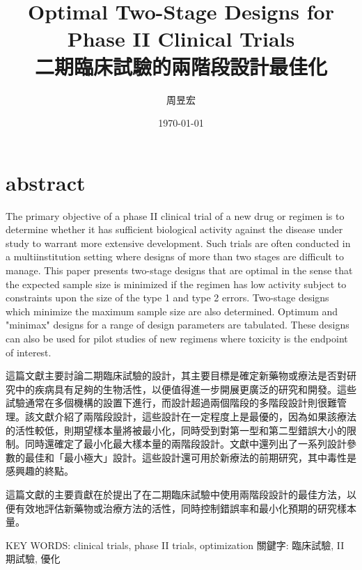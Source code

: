 
\title{Optimal Two-Stage Designs for Phase II Clinical Trials\\二期臨床試驗的兩階段設計最佳化}
\author{{周昱宏}}
\date{{\TT \today}}

\maketitle
\fontsize{12}{22 pt}\selectfont
\doublespacing

\section{abstract}
	The primary objective of a phase II clinical trial of a new drug or regimen is to determine whether it has sufficient biological activity against the disease under study to warrant more extensive development. Such trials are often conducted in a multiinstitution setting where designs of more than two stages are difficult to manage. This paper presents two-stage designs that are optimal in the sense that the expected sample size is minimized if the regimen has low activity subject to constraints upon the size of the type 1 and type 2 errors. Two-stage designs which minimize the maximum sample size are also determined. Optimum and "minimax" designs for a range of design parameters are tabulated. These designs can also be used for pilot studies of new regimens where toxicity is the endpoint of interest. 

	這篇文獻主要討論二期臨床試驗的設計，其主要目標是確定新藥物或療法是否對研究中的疾病具有足夠的生物活性，以便值得進一步開展更廣泛的研究和開發。這些試驗通常在多個機構的設置下進行，而設計超過兩個階段的多階段設計則很難管理。該文獻介紹了兩階段設計，這些設計在一定程度上是最優的，因為如果該療法的活性較低，則期望樣本量將被最小化，同時受到對第一型和第二型錯誤大小的限制。同時還確定了最小化最大樣本量的兩階段設計。文獻中還列出了一系列設計參數的最佳和「最小極大」設計。這些設計還可用於新療法的前期研究，其中毒性是感興趣的終點。

這篇文獻的主要貢獻在於提出了在二期臨床試驗中使用兩階段設計的最佳方法，以便有效地評估新藥物或治療方法的活性，同時控制錯誤率和最小化預期的研究樣本量。

KEY WORDS: clinical trials, phase II trials, optimization 
關鍵字: 臨床試驗, II 期試驗, 優化

